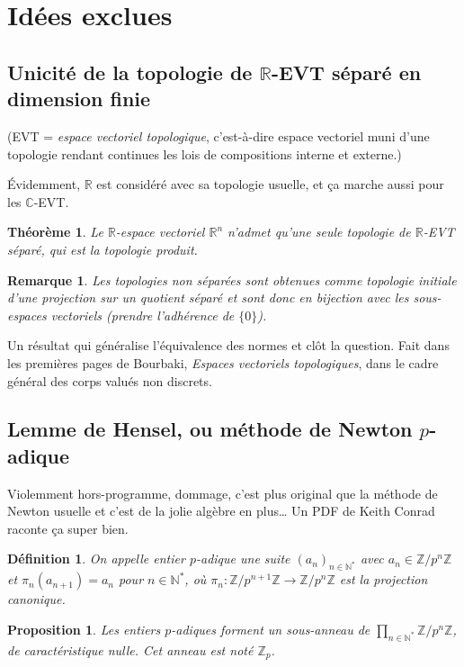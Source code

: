 \documentclass[a4paper, 11pt]{article}
\def\Z{\mathbb{Z}}
\def\N{\mathbb{N}}
\def\R{\mathbb{R}}
\def\C{\mathbb{C}}
\newtheorem*{definition}{Définition}
\newtheorem*{proposition}{Proposition}
\newtheorem*{theorem}{Théorème}
\newtheorem*{remark}{Remarque}
\begin{document}
\section{Idées exclues}

\subsection{Unicité de la topologie de $\R$-EVT séparé en dimension finie}

(EVT = \emph{espace vectoriel topologique}, c'est-à-dire espace vectoriel muni
d'une topologie rendant continues les lois de compositions interne et externe.)

Évidemment, $\R$ est considéré avec sa topologie usuelle, et ça marche aussi
pour les $\C$-EVT.

\begin{theorem}
  Le $\R$-espace vectoriel $\R^n$ n'admet qu'une seule topologie de $\R$-EVT
  séparé, qui est la topologie produit.
\end{theorem}

\begin{remark}
  Les topologies non séparées sont obtenues comme topologie initiale d'une
  projection sur un quotient séparé et sont donc en bijection avec les
  sous-espaces vectoriels (prendre l'adhérence de $\{0\}$).
\end{remark}

Un résultat qui généralise l'équivalence des normes et clôt la question. Fait
dans les premières pages de Bourbaki, \emph{Espaces vectoriels topologiques},
dans le cadre général des corps valués non discrets.

\subsection{Lemme de Hensel, ou méthode de Newton $p$-adique}

Violemment hors-programme, dommage, c'est plus original que la méthode de Newton
usuelle et c'est de la jolie algèbre en plus… Un PDF de Keith Conrad raconte ça
super bien.

\begin{definition}
  On appelle \emph{entier $p$-adique} une suite $(a_n)_{n \in \N^*}$
  avec $a_n \in \Z/p^n\Z$ et $\pi_n(a_{n+1}) = a_n$ pour $n \in \N^*$,
  où $\pi_n : \Z/p^{n+1}\Z \to \Z/p^n\Z$ est la projection canonique.
\end{definition}
\begin{proposition}
  Les entiers $p$-adiques forment un sous-anneau de
  $\prod_{n \in \N^*} \Z/p^n\Z$, de caractéristique nulle. Cet anneau
  est noté $\Z_p$.
\end{proposition}
\end{document}

